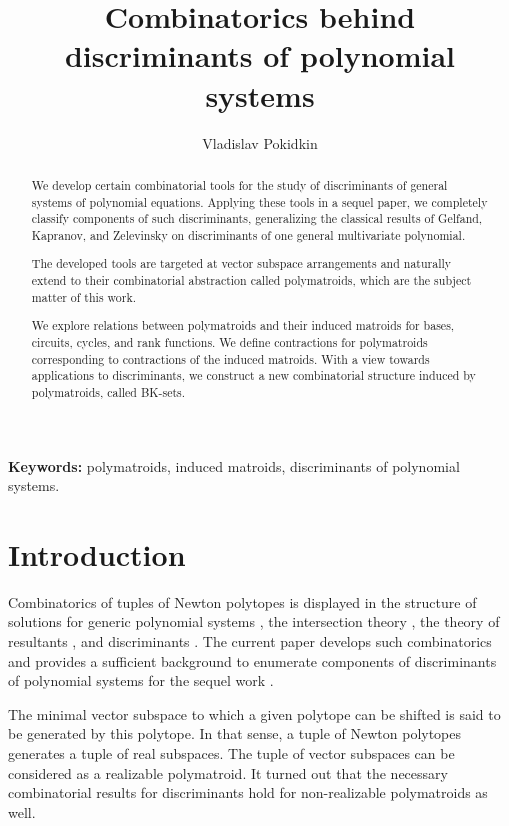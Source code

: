 \documentclass[11pt]{article}
\theoremstyle{plain}
\theoremstyle{definition}
\theoremstyle{remark}
\theoremstyle{plain}
\theoremstyle{plain}
\theoremstyle{plain}
\theoremstyle{definition}
\begin{document}
\title{Combinatorics behind discriminants of polynomial systems}
\author{Vladislav Pokidkin}
\maketitle
\begin{abstract}
We develop certain combinatorial tools for the study of discriminants
of general systems of polynomial equations. Applying these tools in
a sequel paper, we completely classify components of such discriminants,
generalizing the classical results of Gelfand, Kapranov, and Zelevinsky
on discriminants of one general multivariate polynomial.

The developed tools are targeted at vector subspace arrangements and
naturally extend to their combinatorial abstraction called polymatroids,
which are the subject matter of this work.

We explore relations between polymatroids and their induced matroids
for bases, circuits, cycles, and rank functions. We define contractions
for polymatroids corresponding to contractions of the induced matroids.
With a view towards applications to discriminants, we construct a
new combinatorial structure induced by polymatroids, called BK-sets.
\end{abstract}
\textbf{Keywords:} polymatroids, induced matroids, discriminants of
polynomial systems.

\section*{Introduction}

Combinatorics of tuples of Newton polytopes is displayed in the structure
of solutions for generic polynomial systems \cite{bernshtein_number_1975,khovanskii_newton_1978,esterov_multivariate_2016,khovanskii_newton_2016},
the intersection theory \cite{fulton_introduction_1993,kaveh_mixed_2010},
the theory of resultants \cite{sturmfels_newton_1994,jensen_computing_2013},
and discriminants \cite{gelfand_discriminants_1994,esterov_newton_2010,cattani_mixed_2013,esterov_discriminant_2013,esterov_galois_2019,dickenstein_iterated_2023}.
The current paper develops such combinatorics and provides a sufficient
background to enumerate components of discriminants of polynomial
systems for the sequel work \cite{pokidkin_components_2025}.

The minimal vector subspace to which a given polytope can be shifted
is said to be generated by this polytope. In that sense, a tuple of
Newton polytopes generates a tuple of real subspaces. The tuple of
vector subspaces can be considered as a realizable polymatroid. It
turned out that the necessary combinatorial results for discriminants
hold for non-realizable polymatroids as well.
\end{document}
